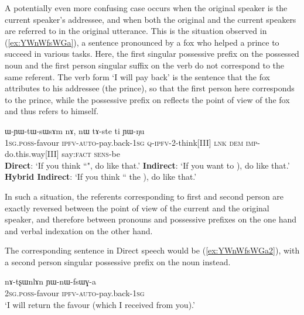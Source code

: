  

A potentially even more confusing case occurs when the original speaker is the current speaker's addressee, and when both the original and the current speakers are referred to in the original utterance. This is the situation observed in (\ref{ex:YWnWfsWGa}), a sentence pronounced by a fox who helped a prince to succeed in various tasks. Here,  the first singular possessive prefix  on the possessed noun  and the first person singular suffix  on the verb  do not correspond to the same referent. The verb form  `I will pay back' is the sentence that the fox attributes to his addressee (the prince), so that the first person here corresponds to the prince, while the possessive prefix on  reflects the point of view of the fox and thus refers to himself.

 \begin{exe}
 \ex \label{ex:YWnWfsWGa}
\gll  {}  ɯ-ɲɯ-tɯ-sɯsɤm nɤ, nɯ tɤ-ste ti ɲɯ-ŋu \\
  {\textsc{1sg}.\textsc{poss}-favour} {\textsc{ipfv}-\textsc{auto}-pay.back-\textsc{1sg}} \textsc{q}-\textsc{ipfv}-2-think[III] \textsc{lnk} \textsc{dem} \textsc{imp}-do.this.way[III] say:\textsc{fact} \textsc{sens}-be \\
\glt    \textbf{Direct}: `If you think ``", do like that.'
\glt    \textbf{Indirect}: `If you want to ), do like that.'
\glt   \textbf{Hybrid Indirect}: `If you think `` the ), do like that.'
\end{exe}

In such a situation, the referents corresponding to first and second person are exactly reversed between the point of view of the current and the original speaker, and therefore between pronouns and possessive prefixes on the one hand and verbal indexation on the other hand.
   
The corresponding sentence in Direct speech would be (\ref{ex:YWnWfsWGa2}), with a second person singular possessive prefix on the noun   instead.

\begin{exe}
\ex \label{ex:YWnWfsWGa2}
\gll nɤ-tʂɯnlɤn ɲɯ-nɯ-fsɯɣ-a \\
  {\textsc{2sg}.\textsc{poss}-favour} {\textsc{ipfv}-\textsc{auto}-pay.back-\textsc{1sg}} \\ 
 \glt `I will return the favour (which I received from you).'
\end{exe}


